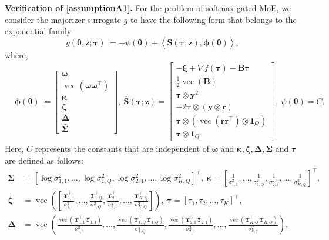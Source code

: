 \documentclass{article}
\DeclareMathOperator*{\vect}{vec} %
\def\phib        {{\sbmm{\phi}}\XS}        \def\Phib       {{\sbmm{\Phi}}\XS}
\def\XS{\xspace}
\def\sbmm#1{\ensuremath{\boldsymbol{#1}}}
\def\eqdef{:=}
\newcommand{\pscal}[2]{\left\langle#1,#2\right\rangle} %
\def\bars{\bar{\vS}}
\def\vxi{{\bm{\xi}}}
\def\vtau{{\bm{\tau}}}
\def\vkappa{{\bm{\kappa}}}
\def\vzeta{{\bm{\zeta}}}
\def\vSigma{{\bm{\Sigma}}}
\def\vomega{{\bm{\omega}}}
\def\vtheta{{\bm{\theta}}}
\def\vr{{\bm{r}}}
\def\vS{{\bm{S}}}
\def\vy{{\bm{y}}}
\def\vz{{\bm{z}}}
\def\mDelta{{\bm{\Delta}}}
\def\mB{{\bm{B}}}
\def\mUpsilon{{\bm{\Upsilon}}}
\begin{document}
\textbf{Verification of \cref{assumptionA1}.}
    For the problem of softmax-gated MoE, we consider the majorizer surrogate $g$ to have the following form that belongs to the exponential family
\begin{equation} \label{eq_exponential_family_appendix}
g\left(\vtheta,\vz;\vtau\right)\eqdef - \psi\left(\vtheta\right)+ \pscal{\bars(\vtau;\vz)}{\phib(\vtheta)},
\end{equation}
where,
\begin{align*}
    &\phib(\vtheta):=
    \begin{bmatrix}
      \vomega\\
      \vect(\vomega\vomega^{\top})\\
      \vkappa\\
      \vzeta \\
      \mDelta\\
      \bar{\vSigma}
    \end{bmatrix}, ~\bars(\vtau;\vz)=
    \begin{bmatrix}
      -\vxi+\nabla f(\vtau)-\mB\vtau \\
      \frac{1}{2}\vect(\mB)\\
      \vtau\otimes \vy^{2} \\
      -2\vtau\otimes(\vy\otimes\vr) \\      \vtau\otimes\left(\vect\left(\vr\vr^{\top}\right)\otimes \mathbf{1}_Q\right)\\
      \vtau\otimes \mathbf{1}_Q
    \end{bmatrix},~\psi(\vtheta)=C.
\end{align*}
Here, $C$ represents the constants that are independent of $\vomega$ and $\vkappa, \vzeta,\mDelta,\bar{\vSigma}$ and $\vtau$ are defined as follows:
\begin{align*}
    \bar{\vSigma}&=[\log\sigma_{1,1}^{2},\dots, \log\sigma_{1,Q}^2, \log\sigma_{2,1}^{2},\dots,\log\sigma_{K,Q}^{2}]^{\top},~\vkappa=\left[\frac{1}{\sigma_{1,1}^{2}},\dots,\frac{1}{\sigma_{1,Q}^2},\frac{1}{\sigma_{2,1}^{2}},\dots,\frac{1}{\sigma_{K,Q}^{2}}\right]^{\top},\\
    \vzeta&=\vect\left(\left[\frac{\mUpsilon_{1,1}^{\top}}{\sigma_{1,1}^{2}},\dots,\frac{\mUpsilon_{1,Q}^{\top}}{\sigma_{1,Q}^{2}},\frac{\mUpsilon_{2,1}^{\top}}{\sigma_{2,1}^{2}},\dots,\frac{\mUpsilon_{K,Q}^{\top}}{\sigma_{K,Q}^{2}}\right]\right),~
    \vtau=[\tau_{1},\tau_{2},\dots,\tau_{K}]^{\top},\\
    \mDelta&=\vect\left(\frac{\vect(\mUpsilon_{1,1}^{\top}\mUpsilon_{1,1})}{\sigma_{1,1}^{2}},\dots,\frac{\vect(\mUpsilon_{1,Q}^{\top}\mUpsilon_{1,Q})}{\sigma_{1,Q}^{2}},\frac{\vect(\mUpsilon_{2,1}^{\top}\mUpsilon_{2,1})}{\sigma_{2,1}^{2}},\dots,\frac{\vect(\mUpsilon_{K,Q}^{\top}\mUpsilon_{K,Q})}{\sigma_{k,q}^2}\right).
\end{align*}
\end{document}
